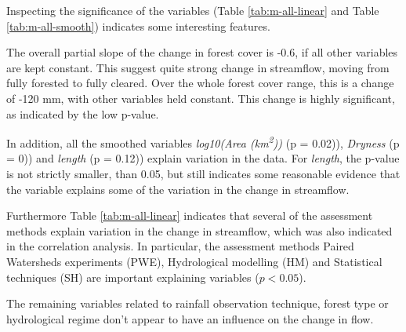 \documentclass[]{elsarticle} %
\begin{document}
Inspecting the significance of the variables (Table \ref{tab:m-all-linear} and Table \ref{tab:m-all-smooth}) indicates some interesting features.

The overall partial slope of the change in forest cover is -0.6, if all other variables are kept constant. This suggest quite strong change in streamflow, moving from fully forested to fully cleared. Over the whole forest cover range, this is a change of -120 mm, with other variables held constant. This change is highly significant, as indicated by the low p-value.

In addition, all the smoothed variables \emph{log10(Area (km\textsuperscript{2}))} (p = 0.02)), \emph{Dryness} (p = 0)) and \emph{length} (p = 0.12)) explain variation in the data. For \emph{length}, the p-value is not strictly smaller, than 0.05, but still indicates some reasonable evidence that the variable explains some of the variation in the change in streamflow.

Furthermore Table \ref{tab:m-all-linear} indicates that several of the assessment methods explain variation in the change in streamflow, which was also indicated in the correlation analysis. In particular, the assessment methods Paired Watersheds experiments (PWE), Hydrological modelling (HM) and Statistical techniques (SH) are important explaining variables (\(p < 0.05\)).

The remaining variables related to rainfall observation technique, forest type or hydrological regime don't appear to have an influence on the change in flow.
\end{document}

